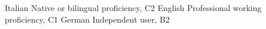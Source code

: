 
\begin{cvskills}

\cvskill
{Italian}
{Native or bilingual proficiency, C2}
\cvskill
{English}
{Professional working proficiency, C1}
\cvskill
{German}
{Independent user, B2}
\end{cvskills}